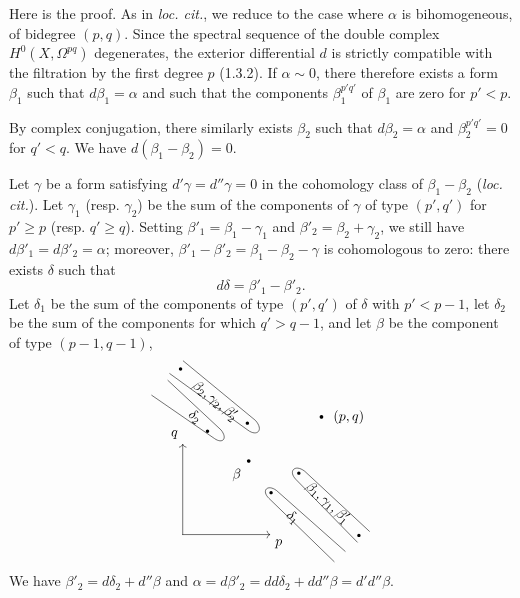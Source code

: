 \documentclass[10pt]{article}
\begin{document}
Here is the proof. As in \textit{loc. cit.}, we reduce to the case where $\alpha$ is bihomogeneous, of bidegree $(p,q)$. Since the spectral sequence of the double complex $H^0(X,\Omega^{pq})$ degenerates, the exterior differential $d$ is strictly compatible with the filtration by the first degree $p$ (1.3.2). If $\alpha\sim0$, there therefore exists a form $\beta_1$ such that $d\beta_1=\alpha$ and such that the components $\beta_1^{p'q'}$ of $\beta_1$ are zero for $p'<p$.

By complex conjugation, there similarly exists $\beta_2$ such that $d\beta_2=\alpha$ and $\beta_2^{p'q'}=0$ for $q'<q$. We have $d(\beta_1-\beta_2)=0$.

Let $\gamma$ be a form satisfying $d'\gamma=d''\gamma=0$ in the cohomology class of $\beta_1-\beta_2$ (\textit{loc. cit.}). Let $\gamma_1$ (resp. $\gamma_2$) be the sum of the components of $\gamma$ of type $(p',q')$ for $p'\ge p$ (resp. $q'\ge q$). Setting $\beta'_1=\beta_1-\gamma_1$ and $\beta'_2=\beta_2+\gamma_2$, we still have $d\beta'_1=d\beta'_2=\alpha$; moreover, $\beta'_1-\beta'_2=\beta_1-\beta_2-\gamma$ is cohomologous to zero: there exists $\delta$ such that
\[
d\delta=\beta'_1-\beta'_2.
\]
Let $\delta_1$ be the sum of the components of type $(p',q')$ of $\delta$ with $p'<p-1$, let $\delta_2$ be the sum of the components for which $q'>q-1$, and let $\beta$ be the component of type $(p-1,q-1)$,
\[
\begin{tikzpicture}[x=.68cm,y=.68cm,baseline=(current bounding box.center),line cap=round,line join=round]
\draw[->] (0,0)--(3.25,0) node[below right] {$p$};
\draw[->] (0,0)--(0,3.35) node[above left] {$q$};
\fill (2.45,2.72) circle (1.3pt) node[below left=2pt] {$\beta$};
\fill (5.15,4.35) circle (1.3pt) node[right=5pt] {$(p,q)$};
\draw (-1.15,5.15)--(1.18,3.55)
  .. controls (1.48,3.34) and (1.68,3.55) .. (1.42,3.87)--(-.55,5.70);
\fill (.92,3.82) circle (1.2pt);
\node[rotate=-39] at (.45,4.35) {$\delta_2$};
\draw (-.48,5.95)--(2.42,3.86)
  .. controls (2.76,3.61) and (3.02,3.86) .. (2.70,4.22)--(.02,6.42);
\fill (-.08,6.12) circle (1.2pt);
\fill (2.40,4.12) circle (1.2pt);
\node[rotate=-39] at (1.20,4.94) {$\beta_2,\gamma_2,\beta'_2$};
\draw (5.62,-1.00)--(3.20,1.34)
  .. controls (2.91,1.62) and (3.14,1.88) .. (3.48,1.63)--(6.03,-.62);
\fill (3.28,1.55) circle (1.2pt);
\node[rotate=-43] at (4.08,.62) {$\delta_1$};
\draw (6.48,-.28)--(4.20,2.04)
  .. controls (3.90,2.35) and (4.17,2.62) .. (4.53,2.34)--(6.93,.12);
\fill (4.31,2.27) circle (1.2pt);
\fill (6.54,-.03) circle (1.2pt);
\node[rotate=-42] at (5.38,1.17) {$\beta_1,\gamma_1,\beta'_1$};
\end{tikzpicture}
\]
We have $\beta'_2=d\delta_2+d''\beta$ and $\alpha=d\beta'_2=dd\delta_2+dd''\beta=d'd''\beta$.
\end{document}
